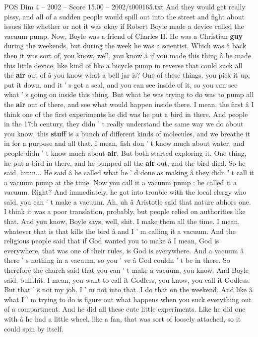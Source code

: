 \begin{textsample}{POS Dim 4 – 2002 – Score 15.00 – 2002/t000165.txt}
And they would get really pissy, and all of a sudden people would spill out into the street and fight about issues like whether or not it was okay if Robert Boyle made a device called the vacuum pump.
Now, Boyle was a friend of Charles II.
He was a Christian \textbf{guy} during the weekends, but during the week he was a scientist.
Which was â back then it was sort of, you know, well, you know â if you made this thing â he made this little device, like kind of like a bicycle pump in reverse that could suck all the \textbf{air} out of â you know what a bell jar is?
One of these things, you pick it up, put it down, and it ' s got a seal, and you can see inside of it, so you can see what ' s going on inside this thing.
But what he was trying to do was to pump all the \textbf{air} out of there, and see what would happen inside there.
I mean, the first â I think one of the first experiments he did was he put a bird in there.
And people in the 17th century, they didn ' t really understand the same way we do about you know, this \textbf{stuff} is a bunch of different kinds of molecules, and we breathe it in for a purpose and all that.
I mean, fish don ' t know much about water, and people didn ' t know much about \textbf{air}.
But both started exploring it.
One thing, he put a bird in there, and he pumped all the \textbf{air} out, and the bird died.
So he said, hmm...
He said â he called what he ' d done as making â they didn ' t call it a vacuum pump at the time.
Now you call it a vacuum pump ; he called it a vacuum.
Right?
And immediately, he got into trouble with the local clergy who said, you can ' t make a vacuum.
Ah, uh â Aristotle said that nature abhors one.
I think it was a poor translation, probably, but people relied on authorities like that.
And you know, Boyle says, well, shit.
I make them all the time.
I mean, whatever that is that kills the bird â and I ' m calling it a vacuum.
And the religious people said that if God wanted you to make â I mean, God is everywhere, that was one of their rules, is God is everywhere.
And a vacuum â there ' s nothing in a vacuum, so you ' ve â God couldn ' t be in there.
So therefore the church said that you can ' t make a vacuum, you know.
And Boyle said, bullshit.
I mean, you want to call it Godless, you know, you call it Godless.
But that ' s not my job.
I ' m not into that.
I do that on the weekend.
And like â what I ' m trying to do is figure out what happens when you suck everything out of a compartment.
And he did all these cute little experiments.
Like he did one with â he had a little wheel, like a fan, that was sort of loosely attached, so it could spin by itself.

\end{textsample}

